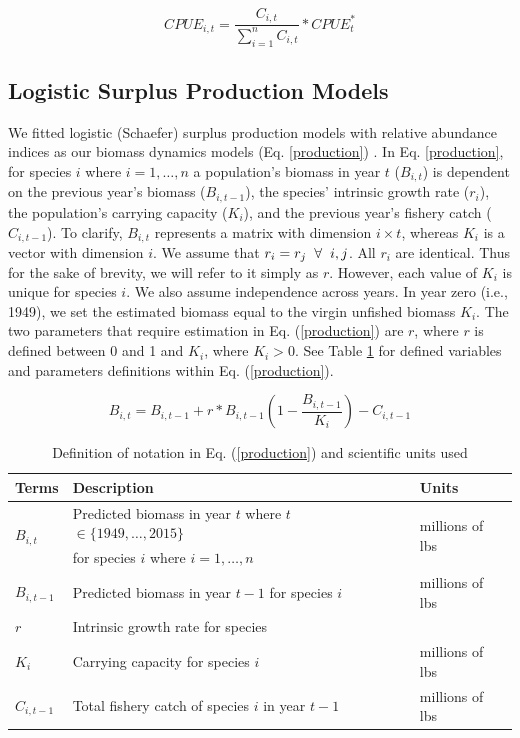 \documentclass[oneside,12pt,final]{sty/ucthesis-CA2012}
\let\cite\citep                             %
\begin{document}
\begin{mainmatter}
\begin{equation} \label{proportion}
CPUE_{i,t} = \frac{C_{i,t}}{\sum_{i=1}^{n}C_{i,t}}*CPUE_t^*
\end{equation}

\subsection{Logistic Surplus Production Models}
We fitted logistic (Schaefer) surplus production models with relative abundance indices as our biomass dynamics models (Eq. \ref{production}) \cite{schaefer1954some}. In Eq. \ref{production}, for species $i$ where $i=1,\dots,n$ a population's biomass in year $t$ ($B_{i,t}$) is dependent on the previous year's biomass ($B_{i,t-1}$), the species' intrinsic growth rate ($r_i$), the population's carrying capacity ($K_i$), and the previous year's fishery catch ($C_{i,t-1}$). To clarify, $B_{i,t}$ represents a matrix with dimension $i\times t$, whereas $K_i$ is a vector with dimension $i$. We assume that $r_i=r_j \hspace{2mm} \forall \hspace{2mm} i,j$. All $r_i$ are identical. Thus for the sake of brevity, we will refer to it simply as $r$. However, each value of $K_i$ is unique for species $i$. We also assume independence across years. In year zero (i.e., 1949), we set the estimated biomass equal to the virgin unfished biomass $K_i$. The two parameters that require estimation in Eq. (\ref{production}) are $r$, where $r$ is defined between 0 and 1 and $K_i$, where $K_i > 0$. See Table \ref{production_table} for defined variables and parameters definitions within Eq. (\ref{production}).

\begin{equation} \label{production}
B_{i,t} = B_{i,t-1} + r*B_{i,t-1} \left(1- \frac{B_{i,t-1}}{K_i} \right)-C_{i,t-1} 
\end{equation}

\begin{table}[H]
\centering
\caption{Definition of notation in Eq. (\ref{production}) and scientific units used}
\begin{tabular}{l|l|l}
  \hline \small
 Terms & Description & Units  \\ 
   \hline
   \multirow{2}{*}{$B_{i,t}$} & Predicted biomass in year $t$ where $t$ $\in \{1949,\dots,2015\}$  & \multirow{2}{*}{millions of lbs} \\
     &  for species $i$ where $i=1,\dots,n$  &   \\      
   $B_{i,t-1}$ &  Predicted biomass in year $t-1$ for species $i$ & millions of lbs  \\
   $r$ & Intrinsic growth rate for species & \\
   $K_i$ & Carrying capacity for species $i$ & millions of lbs  \\  
   $C_{i,t-1}$ & Total fishery catch of species $i$ in year $t-1$ & millions of lbs \\
   \hline
\end{tabular} 
\label{production_table}
\end{table}


\end{mainmatter}
\end{document}
